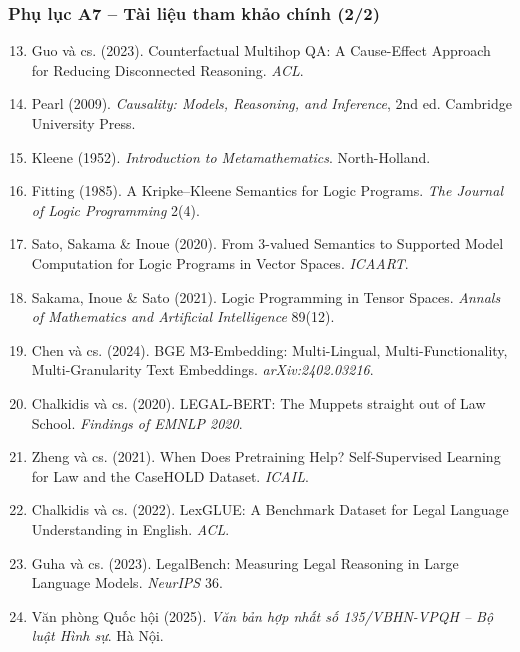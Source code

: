 \begin{frame}
\frametitle{Phụ lục A7 -- Tài liệu tham khảo chính (2/2)}
\scriptsize
\begin{enumerate}\setcounter{enumi}{12}\setlength{\itemsep}{1pt}
  \item Guo và cs. (2023). Counterfactual Multihop QA: A Cause-Effect Approach for Reducing Disconnected Reasoning. \textit{ACL}.
  \item Pearl (2009). \textit{Causality: Models, Reasoning, and Inference}, 2nd ed. Cambridge University Press.
  \item Kleene (1952). \textit{Introduction to Metamathematics}. North-Holland.
  \item Fitting (1985). A Kripke--Kleene Semantics for Logic Programs. \textit{The Journal of Logic Programming} 2(4).
  \item Sato, Sakama \& Inoue (2020). From 3-valued Semantics to Supported Model Computation for Logic Programs in Vector Spaces. \textit{ICAART}.
  \item Sakama, Inoue \& Sato (2021). Logic Programming in Tensor Spaces. \textit{Annals of Mathematics and Artificial Intelligence} 89(12).
  \item Chen và cs. (2024). BGE M3-Embedding: Multi-Lingual, Multi-Functionality, Multi-Granularity Text Embeddings. \textit{arXiv:2402.03216}.
  \item Chalkidis và cs. (2020). LEGAL-BERT: The Muppets straight out of Law School. \textit{Findings of EMNLP 2020}.
  \item Zheng và cs. (2021). When Does Pretraining Help? Self-Supervised Learning for Law and the CaseHOLD Dataset. \textit{ICAIL}.
  \item Chalkidis và cs. (2022). LexGLUE: A Benchmark Dataset for Legal Language Understanding in English. \textit{ACL}.
  \item Guha và cs. (2023). LegalBench: Measuring Legal Reasoning in Large Language Models. \textit{NeurIPS} 36.
  \item Văn phòng Quốc hội (2025). \textit{Văn bản hợp nhất số 135/VBHN-VPQH -- Bộ luật Hình sự}. Hà Nội.
\end{enumerate}
\end{frame}
